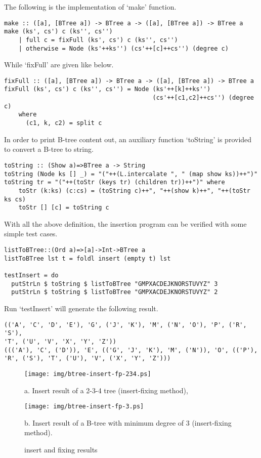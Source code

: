 \documentclass{article}
\begin{document}
The following is the implementation of `make' function.

\begin{lstlisting}
make :: ([a], [BTree a]) -> BTree a -> ([a], [BTree a]) -> BTree a
make (ks', cs') c (ks'', cs'')
    | full c = fixFull (ks', cs') c (ks'', cs'')
    | otherwise = Node (ks'++ks'') (cs'++[c]++cs'') (degree c)
\end{lstlisting}

While `fixFull' are given like below.

\begin{lstlisting}
fixFull :: ([a], [BTree a]) -> BTree a -> ([a], [BTree a]) -> BTree a
fixFull (ks', cs') c (ks'', cs'') = Node (ks'++[k]++ks'')
                                         (cs'++[c1,c2]++cs'') (degree c)
    where
      (c1, k, c2) = split c
\end{lstlisting}

In order to print B-tree content out, an auxiliary function `toString'
is provided to convert a B-tree to string.

\begin{lstlisting}
toString :: (Show a)=>BTree a -> String
toString (Node ks [] _) = "("++(L.intercalate ", " (map show ks))++")"
toString tr = "("++(toStr (keys tr) (children tr))++")" where
    toStr (k:ks) (c:cs) = (toString c)++", "++(show k)++", "++(toStr ks cs)
    toStr [] [c] = toString c
\end{lstlisting}

With all the above definition, the insertion program can be verified with
some simple test cases.

\begin{lstlisting}
listToBTree::(Ord a)=>[a]->Int->BTree a
listToBTree lst t = foldl insert (empty t) lst

testInsert = do
  putStrLn $ toString $ listToBTree "GMPXACDEJKNORSTUVYZ" 3
  putStrLn $ toString $ listToBTree "GMPXACDEJKNORSTUVYZ" 2
\end{lstlisting}

Run `testInsert' will generate the following result.

\begin{verbatim}
(('A', 'C', 'D', 'E'), 'G', ('J', 'K'), 'M', ('N', 'O'), 'P', ('R', 'S'), 
'T', ('U', 'V', 'X', 'Y', 'Z'))
((('A'), 'C', ('D')), 'E', (('G', 'J', 'K'), 'M', ('N')), 'O', (('P'), 
'R', ('S'), 'T', ('U'), 'V', ('X', 'Y', 'Z')))
\end{verbatim}

\begin{figure}[htbp]
  \begin{center}
    \texttt{[image: img/btree-insert-fp-234.ps]}

    a. Insert result of a 2-3-4 tree (insert-fixing method),

    \texttt{[image: img/btree-insert-fp-3.ps]}

    b. Insert result of a B-tree with minimum degree of 3 (insert-fixing method). 
    \caption{insert and fixing results} \label{fig:btree-insert-fp}
  \end{center}
\end{figure}
\end{document}
